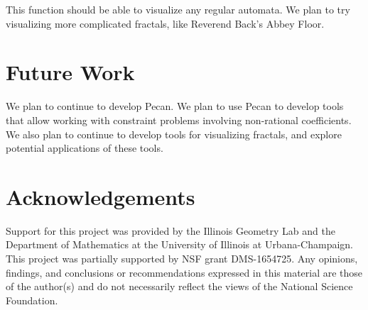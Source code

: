 \documentclass[10pt,usenames,dvipsnames]{article}
\begin{document}
This function should be able to visualize any regular automata. 
We plan to try visualizing more complicated fractals, like Reverend Back's Abbey Floor.

\section{Future Work}

We plan to continue to develop Pecan.
We plan to use Pecan to develop tools that allow working with constraint problems involving non-rational coefficients.
We also plan to continue to develop tools for visualizing fractals, and explore potential applications of these tools.

\section*{Acknowledgements}
Support for this project was provided by the Illinois Geometry Lab and the Department of Mathematics at the University of Illinois at Urbana-Champaign. 
This project was partially supported by NSF grant DMS-1654725. Any opinions, findings, and conclusions or recommendations expressed in this material are those of the author(s) and do not necessarily reflect the views of the National Science Foundation.

\printbibliography
\end{document}

